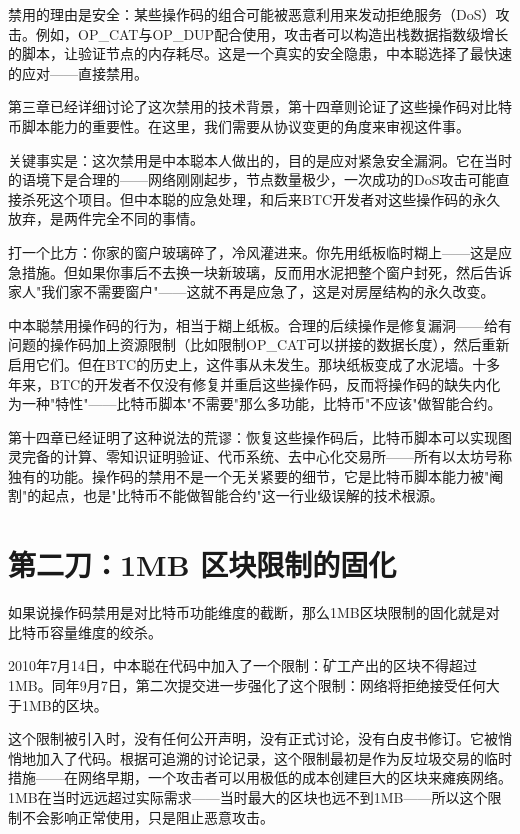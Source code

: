 \documentclass[a4paper,12pt,openany]{ctexbook}
\begin{document}
禁用的理由是安全：某些操作码的组合可能被恶意利用来发动拒绝服务（DoS）攻击。例如，OP\_CAT与OP\_DUP配合使用，攻击者可以构造出栈数据指数级增长的脚本，让验证节点的内存耗尽。这是一个真实的安全隐患，中本聪选择了最快速的应对——直接禁用。

第三章已经详细讨论了这次禁用的技术背景，第十四章则论证了这些操作码对比特币脚本能力的重要性。在这里，我们需要从协议变更的角度来审视这件事。

关键事实是：这次禁用是中本聪本人做出的，目的是应对紧急安全漏洞。它在当时的语境下是合理的——网络刚刚起步，节点数量极少，一次成功的DoS攻击可能直接杀死这个项目。但中本聪的应急处理，和后来BTC开发者对这些操作码的永久放弃，是两件完全不同的事情。

打一个比方：你家的窗户玻璃碎了，冷风灌进来。你先用纸板临时糊上——这是应急措施。但如果你事后不去换一块新玻璃，反而用水泥把整个窗户封死，然后告诉家人"我们家不需要窗户"——这就不再是应急了，这是对房屋结构的永久改变。

中本聪禁用操作码的行为，相当于糊上纸板。合理的后续操作是修复漏洞——给有问题的操作码加上资源限制（比如限制OP\_CAT可以拼接的数据长度），然后重新启用它们。但在BTC的历史上，这件事从未发生。那块纸板变成了水泥墙。十多年来，BTC的开发者不仅没有修复并重启这些操作码，反而将操作码的缺失内化为一种"特性"——比特币脚本"不需要"那么多功能，比特币"不应该"做智能合约。

第十四章已经证明了这种说法的荒谬：恢复这些操作码后，比特币脚本可以实现图灵完备的计算、零知识证明验证、代币系统、去中心化交易所——所有以太坊号称独有的功能。操作码的禁用不是一个无关紧要的细节，它是比特币脚本能力被"阉割"的起点，也是"比特币不能做智能合约"这一行业级误解的技术根源。


\section*{第二刀：1MB 区块限制的固化}


如果说操作码禁用是对比特币功能维度的截断，那么1MB区块限制的固化就是对比特币容量维度的绞杀。

2010年7月14日，中本聪在代码中加入了一个限制：矿工产出的区块不得超过1MB。同年9月7日，第二次提交进一步强化了这个限制：网络将拒绝接受任何大于1MB的区块。

这个限制被引入时，没有任何公开声明，没有正式讨论，没有白皮书修订。它被悄悄地加入了代码。根据可追溯的讨论记录，这个限制最初是作为反垃圾交易的临时措施——在网络早期，一个攻击者可以用极低的成本创建巨大的区块来瘫痪网络。1MB在当时远远超过实际需求——当时最大的区块也远不到1MB——所以这个限制不会影响正常使用，只是阻止恶意攻击。
\end{document}
